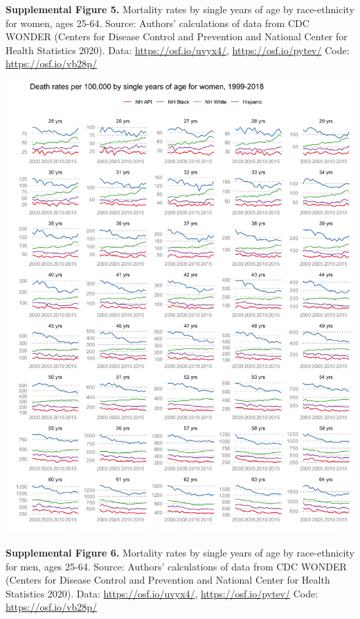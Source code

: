 \documentclass[
  11pt,
]{article}
\begin{document}
\newpage

\textbf{Supplemental Figure 5.} Mortality rates by single years of age
by race-ethnicity for women, ages 25-64. Source: Authors' calculations
of data from CDC WONDER (Centers for Disease Control and Prevention and
National Center for Health Statistics 2020). Data:
\url{https://osf.io/uvyx4/}, \url{https://osf.io/pytev/} Code:
\url{https://osf.io/vb28p/}

\includegraphics[width=0.9\linewidth]{../figures/single-ages-women}

\newpage

\textbf{Supplemental Figure 6.} Mortality rates by single years of age
by race-ethnicity for men, ages 25-64. Source: Authors' calculations of
data from CDC WONDER (Centers for Disease Control and Prevention and
National Center for Health Statistics 2020). Data:
\url{https://osf.io/uvyx4/}, \url{https://osf.io/pytev/} Code:
\url{https://osf.io/vb28p/}
\end{document}
